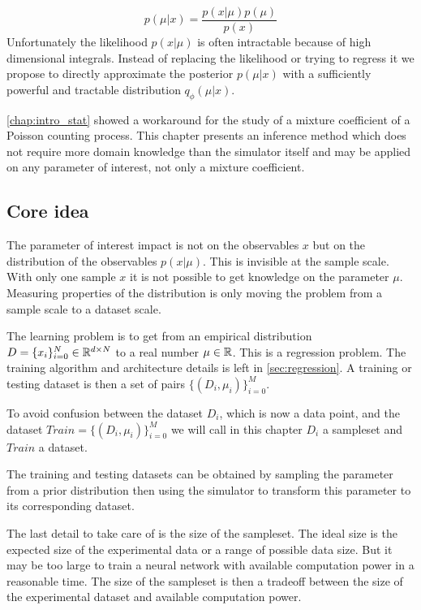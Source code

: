 \begin{equation}
    p(\mu | x) = \frac{p(x | \mu) p(\mu) }{p(x)}
\end{equation}
Unfortunately the likelihood $p(x | \mu)$ is often intractable because of high dimensional integrals.
Instead of replacing the likelihood or trying to regress it we propose to directly approximate the posterior $p(\mu | x)$ with a sufficiently powerful and tractable distribution $q_\phi(\mu | x)$.

\autoref{chap:intro_stat} showed a workaround for the study of a mixture coefficient of a Poisson counting process.
This chapter presents an inference method which does not require more domain knowledge than the simulator itself and may be applied on any parameter of interest, not only a mixture coefficient.







\subsection{Core idea} %
\label{sub:core_idea}


The parameter of interest impact is not on the observables $x$ but on the distribution of the observables $p(x|\mu)$.
This is invisible at the sample scale.
With only one sample $x$ it is not possible to get knowledge on the parameter $\mu$.
Measuring properties of the distribution is only moving the problem from a sample scale to a dataset scale.

The learning problem is to get from an empirical distribution $D = \{x_i\}_{i=0}^N \in \mathbb{R}^{d\times N}$ to a real number $\mu \in \mathbb{R}$.
This is a regression problem.
The training algorithm and architecture details is left in \autoref{sec:regression}.
A training or testing dataset is then a set of pairs $\{(D_i, \mu_i)\}_{i=0}^M$.

To avoid confusion between the dataset $D_i$, which is now a data point, and the dataset $Train = \{(D_i, \mu_i)\}_{i=0}^M$ we will call in this chapter $D_i$ a sampleset and $Train$ a dataset.

The training and testing datasets can be obtained by sampling the parameter from a prior distribution then using the simulator to transform this parameter to its corresponding dataset.

The last detail to take care of is the size of the sampleset.
The ideal size is the expected size of the experimental data or a range of possible data size.
But it may be too large to train a neural network with available computation power in a reasonable time.
The size of the sampleset is then a tradeoff between the size of the experimental dataset and available computation power.

